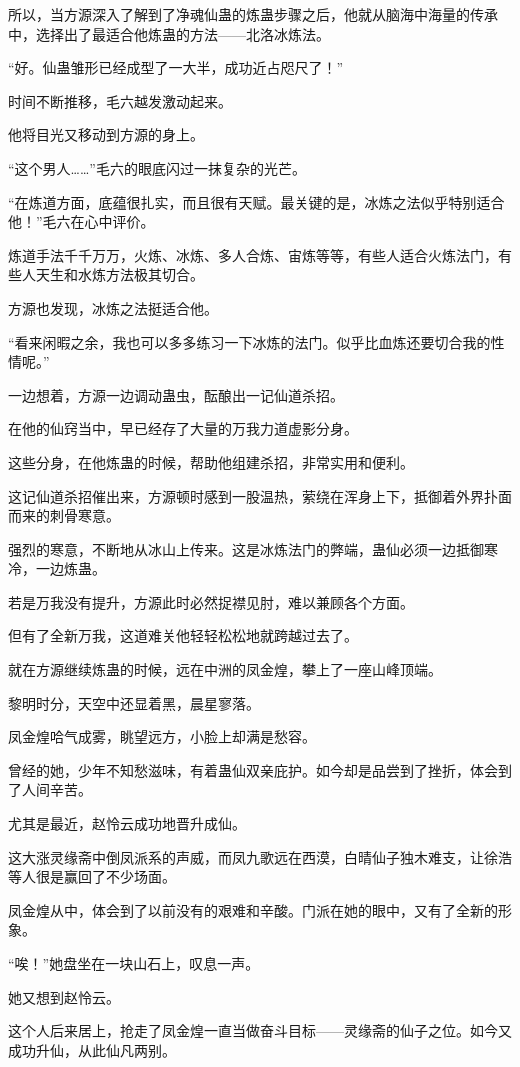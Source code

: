 \begin{this_body}
所以，当方源深入了解到了净魂仙蛊的炼蛊步骤之后，他就从脑海中海量的传承中，选择出了最适合他炼蛊的方法——北洛冰炼法。

“好。仙蛊雏形已经成型了一大半，成功近占咫尺了！”

时间不断推移，毛六越发激动起来。

他将目光又移动到方源的身上。

“这个男人……”毛六的眼底闪过一抹复杂的光芒。

“在炼道方面，底蕴很扎实，而且很有天赋。最关键的是，冰炼之法似乎特别适合他！”毛六在心中评价。

炼道手法千千万万，火炼、冰炼、多人合炼、宙炼等等，有些人适合火炼法门，有些人天生和水炼方法极其切合。

方源也发现，冰炼之法挺适合他。

“看来闲暇之余，我也可以多多练习一下冰炼的法门。似乎比血炼还要切合我的性情呢。”

一边想着，方源一边调动蛊虫，酝酿出一记仙道杀招。

在他的仙窍当中，早已经存了大量的万我力道虚影分身。

这些分身，在他炼蛊的时候，帮助他组建杀招，非常实用和便利。

这记仙道杀招催出来，方源顿时感到一股温热，萦绕在浑身上下，抵御着外界扑面而来的刺骨寒意。

强烈的寒意，不断地从冰山上传来。这是冰炼法门的弊端，蛊仙必须一边抵御寒冷，一边炼蛊。

若是万我没有提升，方源此时必然捉襟见肘，难以兼顾各个方面。

但有了全新万我，这道难关他轻轻松松地就跨越过去了。

就在方源继续炼蛊的时候，远在中洲的凤金煌，攀上了一座山峰顶端。

黎明时分，天空中还显着黑，晨星寥落。

凤金煌哈气成雾，眺望远方，小脸上却满是愁容。

曾经的她，少年不知愁滋味，有着蛊仙双亲庇护。如今却是品尝到了挫折，体会到了人间辛苦。

尤其是最近，赵怜云成功地晋升成仙。

这大涨灵缘斋中倒凤派系的声威，而凤九歌远在西漠，白晴仙子独木难支，让徐浩等人很是赢回了不少场面。

凤金煌从中，体会到了以前没有的艰难和辛酸。门派在她的眼中，又有了全新的形象。

“唉！”她盘坐在一块山石上，叹息一声。

她又想到赵怜云。

这个人后来居上，抢走了凤金煌一直当做奋斗目标——灵缘斋的仙子之位。如今又成功升仙，从此仙凡两别。


\end{this_body}
